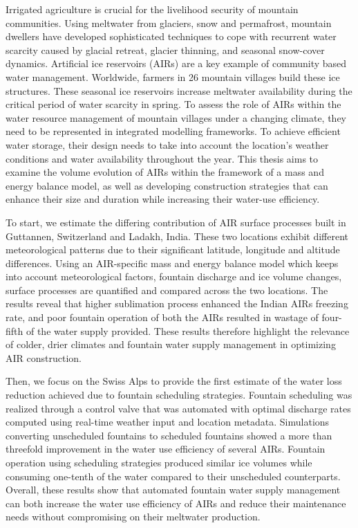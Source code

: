 %
\label{sec:abstract}

Irrigated agriculture is crucial for the livelihood security of mountain communities. Using meltwater from
glaciers, snow and permafrost, mountain dwellers have developed sophisticated techniques to cope with recurrent
water scarcity caused by glacial retreat, glacier thinning, and seasonal snow-cover dynamics. Artificial ice
reservoirs (AIRs) are a key example of community based water management. Worldwide, farmers in 26 mountain
villages build these ice structures. These seasonal ice reservoirs increase meltwater availability during the
critical period of water scarcity in spring. To assess the role of AIRs within the water resource management of
mountain villages under a changing climate, they need to be represented in integrated modelling frameworks. To
achieve efficient water storage, their design needs to take into account the location's weather conditions and
water availability throughout the year. This thesis aims to examine the volume evolution of AIRs within the framework of a mass and
energy balance model, as well as developing construction strategies that can enhance their size and duration
while increasing their water-use efficiency. 

To start, we estimate the differing contribution of AIR surface processes built in Guttannen, Switzerland and
Ladakh, India. These two locations exhibit different meteorological patterns due to their significant latitude,
longitude and altitude differences. Using an AIR-specific mass and energy balance model which keeps into account
meteorological factors, fountain discharge and ice volume changes, surface processes are quantified and compared
across the two locations. The results reveal that higher sublimation process enhanced the Indian AIRs freezing
rate, and poor fountain operation of both the AIRs resulted in wastage of four-fifth of the water supply
provided. These results therefore highlight the relevance of colder, drier climates and fountain water supply
management in optimizing  AIR construction.  

Then, we focus on the Swiss Alps to provide the first estimate of the water loss reduction achieved due to
fountain scheduling strategies. Fountain scheduling was realized through a control valve that was automated with
optimal discharge rates computed using real-time weather input and location metadata. Simulations converting
unscheduled fountains to scheduled fountains showed a more than threefold improvement in the water use
efficiency of several AIRs. Fountain operation using scheduling strategies produced similar ice volumes while
consuming one-tenth of the water compared to their unscheduled counterparts.  Overall, these results show that
automated fountain water supply management can both increase the water use efficiency of AIRs and reduce their
maintenance needs without compromising on their meltwater production.


